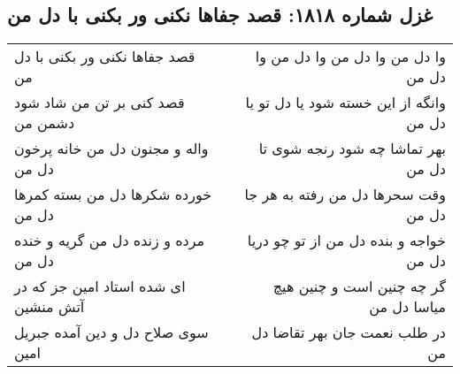 \begin{center}
\section*{غزل شماره ۱۸۱۸: قصد جفاها نکنی ور بکنی با دل من}
\label{sec:1818}
\begin{longtable}{l p{0.5cm} r}
قصد جفاها نکنی ور بکنی با دل من
&&
وا دل من وا دل من وا دل من وا دل من
\\
قصد کنی بر تن من شاد شود دشمن من
&&
وانگه از این خسته شود یا دل تو یا دل من
\\
واله و مجنون دل من خانه پرخون دل من
&&
بهر تماشا چه شود رنجه شوی تا دل من
\\
خورده شکرها دل من بسته کمرها دل من
&&
وقت سحرها دل من رفته به هر جا دل من
\\
مرده و زنده دل من گریه و خنده دل من
&&
خواجه و بنده دل من از تو چو دریا دل من
\\
ای شده استاد امین جز که در آتش منشین
&&
گر چه چنین است و چنین هیچ میاسا دل من
\\
سوی صلاح دل و دین آمده جبریل امین
&&
در طلب نعمت جان بهر تقاضا دل من
\\
\end{longtable}
\end{center}
